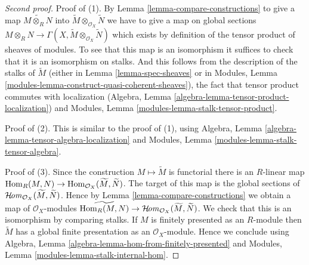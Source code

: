 \begin{proof}[Second proof]
Proof of (1). By Lemma \ref{lemma-compare-constructions} to give a map
$\widetilde{M \otimes_R N}$ into
$\widetilde M \otimes_{\mathcal{O}_X} \widetilde N$
we have to give a map on global sections
$M \otimes_R N \to
\Gamma(X, \widetilde M \otimes_{\mathcal{O}_X} \widetilde N)$
which exists by definition of the tensor product of sheaves
of modules. To see that this map is an isomorphism it
suffices to check that it is an isomorphism on stalks.
And this follows from the description of the stalks
of $\widetilde{M}$ (either in Lemma \ref{lemma-spec-sheaves} or in
Modules, Lemma \ref{modules-lemma-construct-quasi-coherent-sheaves}),
the fact that tensor product commutes with localization
(Algebra, Lemma \ref{algebra-lemma-tensor-product-localization}) and
Modules, Lemma \ref{modules-lemma-stalk-tensor-product}.

\medskip\noindent
Proof of (2). This is similar to the proof of (1), using
Algebra, Lemma \ref{algebra-lemma-tensor-algebra-localization} and
Modules, Lemma \ref{modules-lemma-stalk-tensor-algebra}.

\medskip\noindent
Proof of (3). Since the construction $M \mapsto \widetilde{M}$ is functorial
there is an $R$-linear map
$\mathop{\mathrm{Hom}}\nolimits_R(M, N) \to \mathop{\mathrm{Hom}}\nolimits_{\mathcal{O}_X}(\widetilde{M}, \widetilde{N})$.
The target of this map is the global sections of
$\mathop{\mathcal{H}\!\mathit{om}}\nolimits_{\mathcal{O}_X}(\widetilde M, \widetilde N)$.
Hence by Lemma \ref{lemma-compare-constructions} we obtain a map
of $\mathcal{O}_X$-modules $\widetilde{\mathop{\mathrm{Hom}}\nolimits_R(M,  N)} \to
\mathop{\mathcal{H}\!\mathit{om}}\nolimits_{\mathcal{O}_X}(\widetilde M, \widetilde N)$.
We check that this is an isomorphism by comparing stalks.
If $M$ is finitely presented as an $R$-module
then $\widetilde M$ has a global finite presentation as an
$\mathcal{O}_X$-module. Hence we conclude using
Algebra, Lemma \ref{algebra-lemma-hom-from-finitely-presented} and
Modules, Lemma \ref{modules-lemma-stalk-internal-hom}.
\end{proof}

